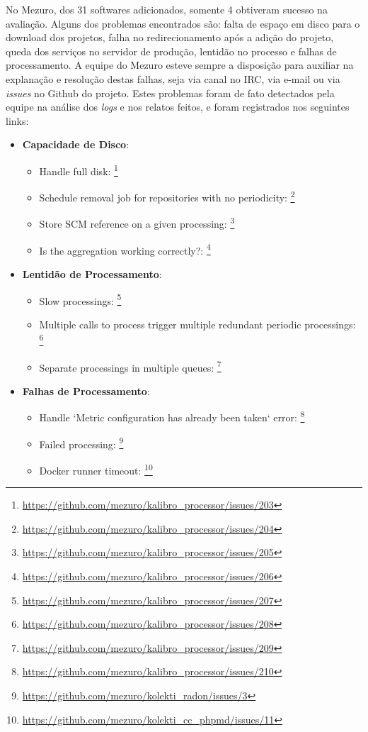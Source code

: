 No Mezuro, dos 31 softwares adicionados, somente 4 obtiveram sucesso na
avaliação. Alguns dos problemas encontrados são: falta de espaço em disco para
o download dos projetos, falha no redirecionamento após a adição do projeto,
queda dos serviços no servidor de produção, lentidão no processo e falhas de
processamento. A equipe do Mezuro esteve sempre a disposição para auxiliar na
explanação e resolução destas falhas, seja via canal no IRC, via e-mail ou via
\textit{issues} no Github do projeto. Estes problemas foram de fato detectados
pela equipe na análise dos \textit{logs} e nos relatos feitos, e foram
registrados nos seguintes links:


\begin{itemize}
  \item \textbf{Capacidade de Disco}:
    \begin{itemize}
      \item Handle full disk: \footnote{\url{https://github.com/mezuro/kalibro\_processor/issues/203}}
      \item Schedule removal job for repositories with no periodicity:
            \footnote{\url{https://github.com/mezuro/kalibro\_processor/issues/204}}
      \item Store SCM reference on a given processing:
            \footnote{\url{https://github.com/mezuro/kalibro\_processor/issues/205}}
      \item Is the aggregation working correctly?:
            \footnote{\url{https://github.com/mezuro/kalibro\_processor/issues/206}}
    \end{itemize}
  \item \textbf{Lentidão de Processamento}:
    \begin{itemize}
      \item Slow processings: \footnote{\url{https://github.com/mezuro/kalibro\_processor/issues/207}}
      \item Multiple calls to process trigger multiple redundant periodic processings:
            \footnote{\url{https://github.com/mezuro/kalibro\_processor/issues/208}}
      \item Separate processings in multiple queues:
            \footnote{\url{https://github.com/mezuro/kalibro\_processor/issues/209}}
    \end{itemize}
  \item \textbf{Falhas de Processamento}:
    \begin{itemize}
      \item Handle `Metric configuration has already been taken` error:
            \footnote{\url{https://github.com/mezuro/kalibro\_processor/issues/210}}
      \item Failed processing: \footnote{\url{https://github.com/mezuro/kolekti\_radon/issues/3}}
      \item Docker runner timeout: \footnote{\url{https://github.com/mezuro/kolekti\_cc\_phpmd/issues/11}}
    \end{itemize}
\end{itemize}

